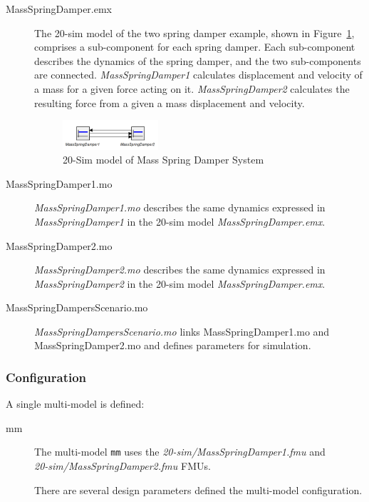\begin{description}
\item[MassSpringDamper.emx] The 20-sim model of the two spring damper example, shown in Figure~\ref{fig:msd20sim}, comprises a sub-component for each spring damper. Each sub-component describes the dynamics of the spring damper, and the two sub-components are connected. \emph{MassSpringDamper1} calculates displacement and velocity of a mass for a given force acting on it. \emph{MassSpringDamper2} calculates the resulting force from a given a mass displacement and velocity.

\begin{figure}[htbp]
	\begin{center}
		\includegraphics[width=0.35\textwidth]{massSpringDamper/massSpringDamper20sim}
		\caption{20-Sim model of Mass Spring Damper System}
		\label{fig:msd20sim}
	\end{center}
\end{figure}


\item[MassSpringDamper1.mo] \emph{MassSpringDamper1.mo} describes the same dynamics expressed in \emph{MassSpringDamper1} in the 20-sim model \emph{MassSpringDamper.emx}.

\item[MassSpringDamper2.mo] \emph{MassSpringDamper2.mo} describes the same dynamics expressed in \emph{MassSpringDamper2} in the 20-sim model \emph{MassSpringDamper.emx}.
 
\item[MassSpringDampersScenario.mo] \emph{MassSpringDampersScenario.mo} links MassSpringDamper1.mo and MassSpringDamper2.mo and defines parameters for simulation.

\end{description}

\subsubsection{Configuration}
\label{sec:masspringdamper_conf}
A single multi-model is defined:
\begin{description}
\item[mm] The multi-model \texttt{mm} uses the \emph{20-sim/MassSpringDamper1.fmu} and \\ \emph{20-sim/MassSpringDamper2.fmu} FMUs.

There are several design parameters defined the multi-model configuration.
\end{description}

